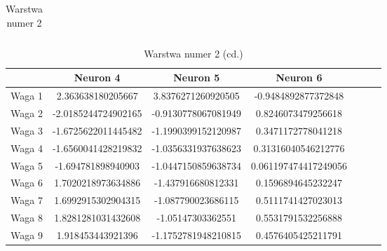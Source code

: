 \documentclass{classrep}
\begin{document}
{\begin{table}[!htbp]
\begin{tabular}{|c|c|c|c|c|c|l|}
            \end{tabular}
            \caption{Warstwa numer 2}
        \end{table}
        \FloatBarrier

        \begin{table}[!htbp]
            \centering
            \begin{tabular}{|c|c|c|c|c|c|l|}
            \hline
                   & Neuron 4      & Neuron 5      & Neuron 6        \\ \hline
            Waga 1 &  2.363638180205667             & 3.8376271260920505              & -0.9484892877372848                \\ \hline
            Waga 2 & -2.0185244724902165              & -0.9130778067081949              & 0.8246073479256618                \\ \hline
            Waga 3 & -1.6725622011445482              & -1.1990399152120987              & 0.3471172778041218                \\ \hline
            Waga 4 & -1.6560041428219832              & -1.0356331937638623              & 0.31316040546212776                \\ \hline
            Waga 5 & -1.694781898940903              &  -1.0447150859638734             & 0.061197474417249056                \\ \hline
            Waga 6 & 1.7020218973634886              & -1.437916680812331              & 0.1596894645232247                \\ \hline
            Waga 7 & 1.6992915302904315              & -1.087790023686115              & 0.5111741427023013                \\ \hline
            Waga 8 & 1.8281281031432608              & -1.05147303362551              &  0.5531791532256888               \\ \hline
            Waga 9 & 1.918453443921396              & -1.1752781948210815              & 0.4576405425211791                \\ \hline

            \end{tabular}
            \caption{Warstwa numer 2 (cd.)}
            \end{table}
        \FloatBarrier


}
\end{document}

